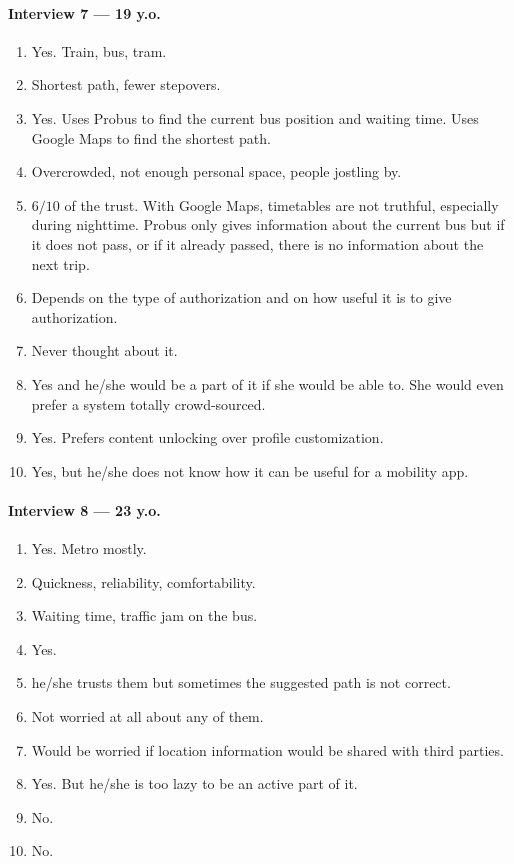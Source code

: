 \documentclass[a4paper, 11pt, twocolumn]{article}
\begin{document}
\paragraph*{Interview 7 --- 19 y.o.}
\begin{enumerate}
	\item Yes. Train, bus, tram.
	\item Shortest path, fewer stepovers.
	\item Yes. Uses Probus to find the current bus position and waiting time. Uses Google Maps to find the shortest path.
	\item Overcrowded, not enough personal space, people jostling by.
	\item $6/10$ of the trust. With Google Maps, timetables are not truthful, especially during nighttime. Probus only gives information about the current bus but if it does not pass, or if it already passed, there is no information about the next trip.
	\item  Depends on the type of authorization and on how useful it is to give authorization.
	\item Never thought about it.
	\item Yes and he/she would be a part of it if she would be able to. She would even prefer a system totally crowd-sourced.
	\item Yes. Prefers content unlocking over profile customization.
	\item Yes, but he/she does not know how it can be useful for a mobility app.
\end{enumerate}

\paragraph*{Interview 8 --- 23 y.o.}
\begin{enumerate}
	\item Yes. Metro mostly.
	\item Quickness, reliability, comfortability.
	\item Waiting time, traffic jam on the bus.
	\item Yes.
	\item he/she trusts them but sometimes the suggested path is not correct.
	\item Not worried at all about any of them.
	\item Would be worried if location information would be shared with third parties.
	\item Yes. But he/she is too lazy to be an active part of it.
	\item No.
	\item No.
\end{enumerate}
\end{document}
